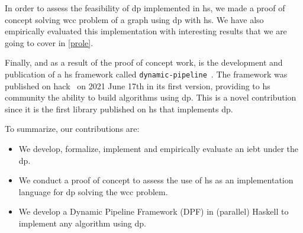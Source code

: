 In order to assess the feasibility of \acrshort{dp} implemented in \acrshort{hs}, we made a proof of concept solving \acrlong{wcc} problem of a graph using \acrshort{dp} with \acrshort{hs}. We have also empirically evaluated this implementation with interesting results that we are going to cover in \autoref{prole}. 

Finally, and as a result of the proof of concept work, is the development and publication of a \acrshort{hs} framework called \texttt{dynamic-pipeline}~\cite{dynamic-pipeline}.  The framework was published on \acrfull{hack}~\cite{hackage} on 2021 June 17th in its first version,
providing to \acrshort{hs} community the ability to build algorithms using \acrshort{dp}. This is a novel contribution since it is the first library published on \acrshort{hs} that implements \acrshort{dp}.

To summarize, our contributions are:
\begin{itemize}
  \item We develop, formalize, implement and empirically evaluate an \acrlong{iebt} under the \acrlong{dp}.
  \item We conduct a proof of concept to assess the use of \acrlong{hs} as an implementation language for \acrlong{dp} solving the \acrlong{wcc} problem.
  \item We develop a Dynamic Pipeline Framework (DPF) in (parallel) Haskell to implement any algorithm using \acrlong{dp}.
\end{itemize}

